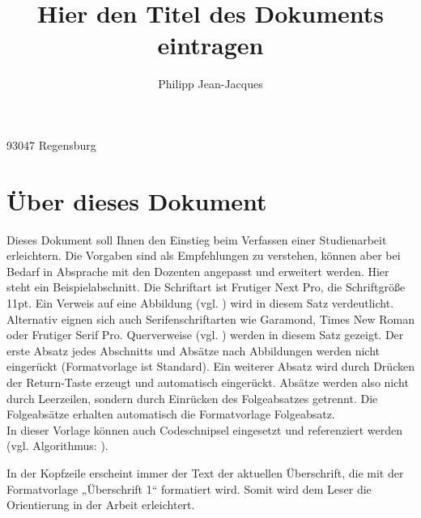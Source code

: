 

\title{Hier den Titel des Dokuments eintragen}
\author{Philipp Jean-Jacques}
\address{Domplatz 1}{93047 Regensburg}
\writemeta



\maketitle
\thispagestyle{empty} %
\newpage

\pagestyle{fancy}
\fancyhead[R]{\thepage}
\fancyhead[L]{\nouppercase{\leftmark}}

\tableofcontents
\newpage
\listoffigures
\newpage
\lstlistoflistings
\newpage


\section{Über dieses Dokument}
Dieses Dokument soll Ihnen den Einstieg beim Verfassen einer Studienarbeit erleichtern. Die Vorgaben sind als Empfehlungen zu verstehen, können aber bei Bedarf in Absprache mit den Dozenten angepasst und erweitert werden. Hier steht ein Beispielabschnitt. Die Schriftart ist Frutiger Next Pro, die 
Schriftgröße 11pt. Ein Verweis auf eine Abbildung (vgl. ) wird in diesem Satz verdeutlicht. Alternativ eignen sich auch Serifenschriftarten wie Garamond, Times New Roman oder Frutiger Serif Pro. Querverweise (vgl. ) werden in diesem Satz  gezeigt. Der erste Absatz jedes Abschnitts und Absätze nach Abbildungen werden nicht eingerückt (Formatvorlage ist Standard). Ein weiterer Absatz wird durch Drücken der Return-Taste erzeugt und automatisch eingerückt. Absätze werden also nicht durch Leerzeilen, sondern durch Einrücken des Folgeabsatzes getrennt. Die Folgeabsätze erhalten automatisch die Formatvorlage Folgeabsatz.\\

In dieser Vorlage können auch Codeschnipsel eingesetzt und referenziert werden (vgl. Algorithmus: ).

In der Kopfzeile erscheint immer der Text der aktuellen Überschrift, die mit der Formatvorlage „Überschrift 1“ formatiert wird. Somit wird dem Leser die Orientierung in der Arbeit erleichtert.\\

